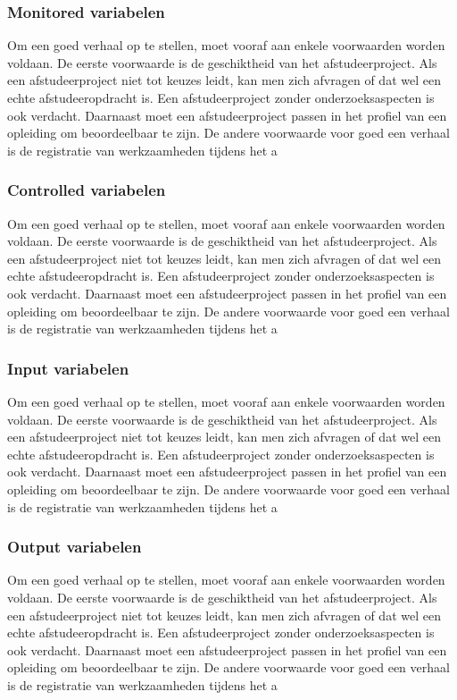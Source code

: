 \subsubsection{Monitored variabelen}

Om een goed verhaal op te stellen, moet vooraf aan enkele voorwaarden
worden voldaan. De eerste voorwaarde is de geschiktheid van het
afstudeerproject. Als een afstudeerproject niet tot keuzes leidt, kan
men zich afvragen of dat wel een echte afstudeeropdracht is. Een
afstudeerproject zonder onderzoeksaspecten is ook verdacht. Daarnaast
moet een afstudeerproject passen in het profiel van een opleiding om
beoordeelbaar te zijn. De andere voorwaarde voor goed een verhaal is
de registratie van werkzaamheden tijdens het a
\subsubsection{Controlled variabelen}

Om een goed verhaal op te stellen, moet vooraf aan enkele voorwaarden
worden voldaan. De eerste voorwaarde is de geschiktheid van het
afstudeerproject. Als een afstudeerproject niet tot keuzes leidt, kan
men zich afvragen of dat wel een echte afstudeeropdracht is. Een
afstudeerproject zonder onderzoeksaspecten is ook verdacht. Daarnaast
moet een afstudeerproject passen in het profiel van een opleiding om
beoordeelbaar te zijn. De andere voorwaarde voor goed een verhaal is
de registratie van werkzaamheden tijdens het a
\subsubsection{Input variabelen}

Om een goed verhaal op te stellen, moet vooraf aan enkele voorwaarden
worden voldaan. De eerste voorwaarde is de geschiktheid van het
afstudeerproject. Als een afstudeerproject niet tot keuzes leidt, kan
men zich afvragen of dat wel een echte afstudeeropdracht is. Een
afstudeerproject zonder onderzoeksaspecten is ook verdacht. Daarnaast
moet een afstudeerproject passen in het profiel van een opleiding om
beoordeelbaar te zijn. De andere voorwaarde voor goed een verhaal is
de registratie van werkzaamheden tijdens het a
\subsubsection{Output variabelen}

Om een goed verhaal op te stellen, moet vooraf aan enkele voorwaarden
worden voldaan. De eerste voorwaarde is de geschiktheid van het
afstudeerproject. Als een afstudeerproject niet tot keuzes leidt, kan
men zich afvragen of dat wel een echte afstudeeropdracht is. Een
afstudeerproject zonder onderzoeksaspecten is ook verdacht. Daarnaast
moet een afstudeerproject passen in het profiel van een opleiding om
beoordeelbaar te zijn. De andere voorwaarde voor goed een verhaal is
de registratie van werkzaamheden tijdens het a


